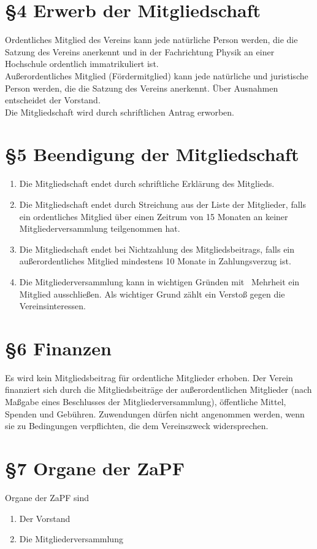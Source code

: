 \documentclass[ngerman]{article}
\begin{document}
\section*{§4 Erwerb der Mitgliedschaft}
Ordentliches Mitglied des Vereins kann jede natürliche Person werden, die die Satzung des Vereins anerkennt und in der Fachrichtung Physik an einer Hochschule ordentlich immatrikuliert ist.\\
Außerordentliches Mitglied (\glqq Fördermitglied\grqq) kann jede natürliche und juristische Person werden,  die die Satzung des Vereins anerkennt.
Über Ausnahmen entscheidet der Vorstand.\\
Die Mitgliedschaft wird durch schriftlichen Antrag erworben.


\section*{§5 Beendigung der Mitgliedschaft}
\begin{enumerate}
 \item Die Mitgliedschaft endet durch schriftliche Erklärung des Mitglieds.
 \item Die Mitgliedschaft endet durch Streichung aus der Liste der Mitglieder, falls ein ordentliches Mitglied über einen Zeitrum von 15 Monaten an keiner Mitgliederversammlung teilgenommen hat.
 \item Die Mitgliedschaft endet bei Nichtzahlung des Mitgliedsbeitrags, falls ein außerordentliches Mitglied mindestens 10 Monate in Zahlungsverzug ist.
 \item Die Mitgliederversammlung kann in wichtigen Gründen mit \textthreequarters\ Mehrheit ein Mitglied ausschließen. Als wichtiger Grund zählt ein Verstoß gegen die Vereinsinteressen.
\end{enumerate}


\section*{§6 Finanzen}
Es wird kein Mitgliedsbeitrag für ordentliche Mitglieder erhoben. Der Verein finanziert sich durch die Mitgliedsbeiträge der außerordentlichen Mitglieder (nach Maßgabe eines Beschlusses der Mitgliederversammlung), öffentliche Mittel, Spenden und Gebühren. Zuwendungen dürfen nicht angenommen werden, wenn sie zu Bedingungen verpflichten, die dem Vereinszweck widersprechen.


\section*{§7 Organe der ZaPF}
Organe der ZaPF sind
\begin{enumerate}
 \item Der Vorstand
 \item Die Mitgliederversammlung
\end{enumerate}
\end{document}
